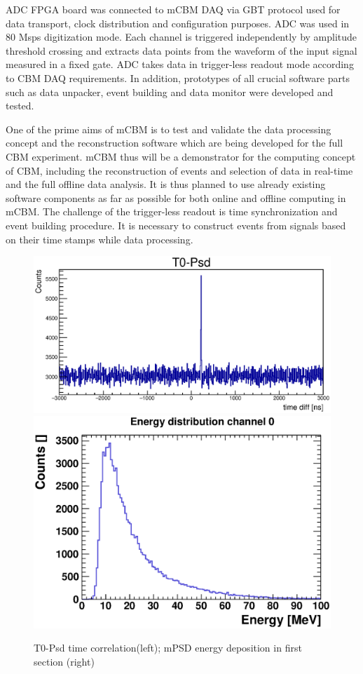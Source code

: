 \documentclass{CBM-PR-2020}
\begin{document}
ADC FPGA board was connected to mCBM DAQ via GBT protocol used for data transport, clock distribution and configuration purposes. ADC was used in 80 Msps digitization mode. Each channel is triggered independently by amplitude threshold crossing and extracts data points from the waveform of the input signal measured in a fixed gate. ADC takes data in trigger-less readout mode according to CBM DAQ requirements. In addition, prototypes of all crucial software parts such as data unpacker, event building and data monitor were developed and tested.


One of the prime aims of mCBM is to test and validate the data processing concept and the reconstruction software which are being developed for the full CBM experiment. mCBM thus will be a demonstrator for the computing concept of CBM, including the reconstruction of events and selection of data in real-time and the full offline data analysis. It is thus planned to use already existing software components as far as possible for both online and offline computing in mCBM.
The challenge of the trigger-less readout is time synchronization and event building procedure. It is necessary to construct events from signals based on their time stamps while data processing.

\begin{figure}[htbp]
\centering %
\includegraphics[width=.5\textwidth]{582_time_spectrum.eps}
\quad
\includegraphics[width=.35\textwidth]{en_distrib_ch0.eps}
\caption{\label{fig:6} T0-Psd time correlation(left);  mPSD energy deposition in first section (right)}
\end{figure}
\end{document}
